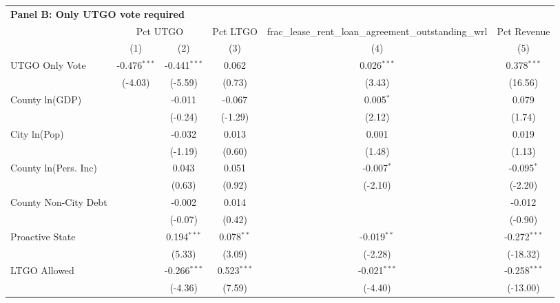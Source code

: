 \begingroup
\centering
\begin{tabular*}{\textwidth}{@{\extracolsep{\fill}}lccccc}
\multicolumn{5}{l}{\textbf{Panel B: Only UTGO vote required}}\\

\addlinespace
   \toprule
    & \multicolumn{2}{c}{Pct UTGO} & Pct LTGO & frac\_lease\_rent\_loan\_agreement\_outstanding\_wrl & Pct Revenue\\
   \cmidrule(lr){2-3}\cmidrule(lr){4-4}\cmidrule(lr){5-5}\cmidrule(lr){6-6}
                        & (1)            & (2)            & (3)            & (4)            & (5)\\  
   \midrule 
   UTGO Only Vote       & -0.476$^{***}$ & -0.441$^{***}$ & 0.062          & 0.026$^{***}$  & 0.378$^{***}$\\   
                        & (-4.03)       & (-5.59)       & (0.73)        & (3.43)        & (16.56)\\   
   County ln(GDP)       &                & -0.011         & -0.067         & 0.005$^{*}$    & 0.079\\   
                        &                & (-0.24)       & (-1.29)       & (2.12)        & (1.74)\\   
   City ln(Pop)         &                & -0.032         & 0.013          & 0.001          & 0.019\\   
                        &                & (-1.19)       & (0.60)        & (1.48)        & (1.13)\\   
   County ln(Pers. Inc) &                & 0.043          & 0.051          & -0.007$^{*}$   & -0.095$^{*}$\\   
                        &                & (0.63)        & (0.92)        & (-2.10)       & (-2.20)\\   
   County Non-City Debt &                & -0.002         & 0.014          &                & -0.012\\   
                        &                & (-0.07)       & (0.42)        &                & (-0.90)\\   
   Proactive State      &                & 0.194$^{***}$  & 0.078$^{**}$   & -0.019$^{**}$  & -0.272$^{***}$\\   
                        &                & (5.33)        & (3.09)        & (-2.28)       & (-18.32)\\   
   LTGO Allowed         &                & -0.266$^{***}$ & 0.523$^{***}$  & -0.021$^{***}$ & -0.258$^{***}$\\   
                        &                & (-4.36)       & (7.59)        & (-4.40)       & (-13.00)\\   

\end{tabular*}
